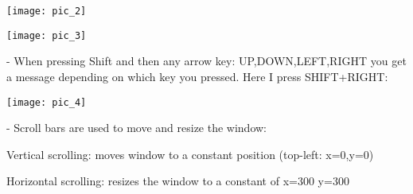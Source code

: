 \texttt{[image: pic\_2]}


\texttt{[image: pic\_3]}


- When pressing Shift and then any arrow key: UP,DOWN,LEFT,RIGHT you get a message depending on which key you pressed. Here I press SHIFT+RIGHT:


\texttt{[image: pic\_4]}


- Scroll bars are used to move and resize the window:


Vertical scrolling: moves window to a constant position (top-left: x=0,y=0)

Horizontal scrolling: resizes the window to a constant of x=300 y=300




\clearpage